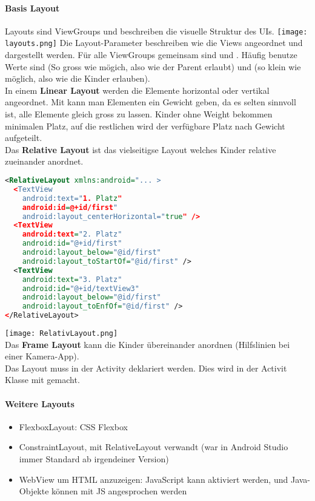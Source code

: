 \paragraph{Basis Layout} Layouts sind ViewGroups und beschreiben die visuelle Struktur des UIs.
\texttt{[image: layouts.png]}
Die Layout-Parameter beschreiben wie die Views angeordnet und dargestellt werden. Für alle ViewGroups gemeinsam sind  und . Häufig benutze Werte sind  (So gross wie mögich, also wie der Parent erlaubt) und  (so klein wie möglich, also wie die Kinder erlauben).\\
In einem \textbf{Linear Layout} werden die Elemente horizontal oder vertikal angeordnet. Mit  kann man Elementen ein Gewicht geben, da es selten sinnvoll ist, alle Elemente gleich gross zu lassen. Kinder ohne Weight bekommen minimalen Platz, auf die restlichen wird der verfügbare Platz nach Gewicht aufgeteilt.\\
Das \textbf{Relative Layout} ist das vielseitigse Layout welches Kinder relative zueinander anordnet.
\begin{lstlisting}[language=xml]
<RelativeLayout xmlns:android="... >
  <TextView
    android:text="1. Platz"
    android:id=@+id/first"
    android:layout_centerHorizontal="true" />
  <TextView
    android:text="2. Platz"
    android:id="@+id/first"
    android:layout_below="@id/first"
    android:layout_toStartOf="@id/first" />
  <TextView
    android:text="3. Platz"
    android:id="@+id/textView3"
    android:layout_below="@id/first"
    android:layout_toEnfOf="@id/first" />
</RelativeLayout>
\end{lstlisting}
\texttt{[image: RelativLayout.png]} \\
Das \textbf{Frame Layout} kann die Kinder übereinander anordnen (Hilfslinien bei einer Kamera-App).\\
Das Layout muss in der Activity deklariert werden. Dies wird in der Activit Klasse mit  gemacht.\\

\paragraph{Weitere Layouts}
\begin{itemize}
  \item FlexboxLayout: CSS Flexbox
  \item ConstraintLayout, mit RelativeLayout verwandt (war in Android Studio immer Standard ab irgendeiner Version)
  \item WebView um HTML anzuzeigen: JavaScript kann aktiviert werden, und Java-Objekte können mit JS angesprochen werden
\end{itemize}

